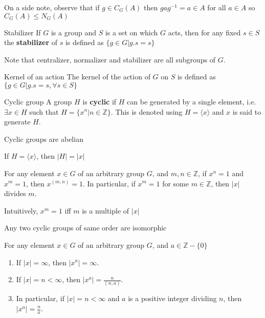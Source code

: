 \documentclass[titlepage, 12pt]{book}
\begin{document}
On a side note, observe that if $g\in C_G(A)$ then $gag^{-1} = a\in A$ for all
$a\in A$ so $C_G(A)\le N_G(A)$

\begin{definition}{Stabilizer}{}
    If $G$ is a group and $S$ is a set on which $G$ acts, then for any fixed
    $s\in S$ the \textbf{stabilizer} of $s$ is defined as $\{g\in G| g.s=s\}$
\end{definition}
Note that centralizer, normalizer and stabilizer are all subgroups of $G$.

\begin{definition}{Kernel of an action}{}
    The kernel of the action of $G$ on $S$ is defined as $\{g\in G| g.s = s,
    \forall s\in S\}$
\end{definition}
\begin{definition}{Cyclic group}{}
    A group $H$ is \textbf{cyclic} if $H$ can be generated by a single element,
    i.e. $\exists x\in H$ such that $H = \{x^n| n\in \mathbb{Z}\}$. This is denoted
    using $H = \langle x\rangle$ and $x$ is said to generate $H$.
\end{definition}
\begin{proposition}{}{}
    Cyclic groups are abelian
\end{proposition}
\begin{proposition}{}{}
    If $H = \langle x\rangle$, then $| H| = | x|$
\end{proposition}
\begin{proposition}{}{}
    For any element $x\in G$ of an arbitrary group $G$, and $m, n\in
        \mathbb{Z}$,
        if $x^n = 1$ and $x^m = 1$, then $x^{(m, n)} = 1$. In particular, if
        $x^m = 1$ for some $m\in \mathbb{Z}$, then $|x|$ divides $m$.
\end{proposition}
Intuitively, $x^m = 1$ iff $m$ is a multiple of $|x|$
\begin{proposition}{}{}
    Any two cyclic groups of same order are isomorphic
\end{proposition}
\begin{proposition}{}{}
    For any element $x\in G$ of an arbitrary group $G$, and $a\in
        \mathbb{Z} - \{0\}$
        \begin{enumerate}
            \item If $|x| = \infty$, then $|x^a| = \infty$.
            \item If $|x| = n < \infty$, then $|x^a| = \frac{n}{(n, a)}$.
            \item In particular, if $|x| = n < \infty$ and $a$ is a positive integer
                dividing $n$, then $|x^a| = \frac{n}{a}$.
        \end{enumerate}
\end{proposition}
\end{document}
